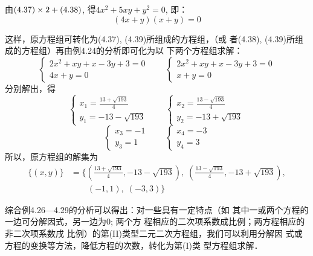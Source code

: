 \begin{solution}
    由$(4.37)\times2+(4.38)$, 得$4x^2+5xy+y^2=0$,  即：
\begin{equation}
    (4x+y)(x+y)=0
\end{equation}

这样，原方程组可转化为(4.37), (4.39)所组成的方程组，（或
者(4.38), (4.39)所组成的方程组）再由例4.24的分析即可化为以
下两个方程组求解：
\[\begin{cases}
    2x^2+xy+x-3y+3=0\\
4x+y=0
\end{cases}\qquad \begin{cases}
    2x^2+xy+x-3y+3=0\\
x+y=0
\end{cases}\]
分别解出，得
\[\begin{cases}
    x_1=\frac{13+\sqrt{193}}{4} \\ y_1=-13-\sqrt{193}
\end{cases}\qquad \begin{cases}
    x_2=\frac{13-\sqrt{193}}{4} \\ y_2=-13+\sqrt{193}
\end{cases}\]
\[\begin{cases}
    x_3=-1\\y_3=1
\end{cases}\qquad \begin{cases}
    x_4=-3\\ y_4=3
\end{cases}\]
所以，原方程组的解集为
\[\begin{split}
    \{(x,y)\}&=\Bigg\{\left(\frac{13+\sqrt{193}}{4}, -13-\sqrt{193}\right),\; \left(\frac{13-\sqrt{193}}{4}, -13+\sqrt{193}\right),\\
    &\qquad  (-1,1),\; (-3,3)\Bigg\}
\end{split}
\]

\end{solution}

综合例4.26---4.29的分析可以得出：对一些具有一定特点（如
其中一或两个方程的一边可分解因式，另一边为0; 两个方
程相应的二次项系数成比例；两方程相应的非二次项系数戌
比例）的第(II)类型二元二次方程组，我们可以利用分解因
式或方程的变换等方法，降低方程的次数，转化为第(I)类
型方程组求解．

